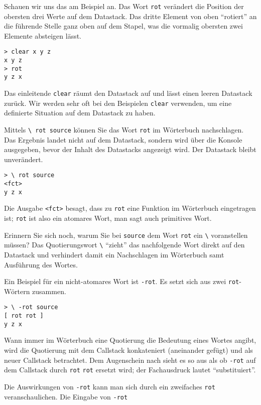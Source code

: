 Schauen wir uns das am Beispiel an. Das Wort \verb|rot| verändert die Position der obersten drei Werte auf dem Datastack. Das dritte Element von oben "`rotiert"' an die führende Stelle ganz oben auf dem Stapel, was die vormalig obersten zwei Elemente absteigen lässt.

\begin{verbatim}
> clear x y z
x y z
> rot
y z x
\end{verbatim}

Das einleitende \verb|clear| räumt den Datastack auf und lässt einen leeren Datastack zurück. Wir werden sehr oft bei den Beispielen \verb|clear| verwenden, um eine definierte Situation auf dem Datastack zu haben.

\label{rotsource}Mittels \verb|\ rot source| können Sie das Wort \verb|rot| im Wörterbuch nachschlagen. Das Ergebnis landet nicht auf dem Datastack, sondern wird über die Konsole ausgegeben, bevor der Inhalt des Datastacks angezeigt wird. Der Datastack bleibt unverändert.

\begin{verbatim}
> \ rot source
<fct>
y z x
\end{verbatim}

Die Ausgabe \verb|<fct>| besagt, dass zu \verb|rot| eine Funktion im Wörterbuch eingetragen ist; \verb|rot| ist also ein atomares Wort, man sagt auch primitives Wort.

Erinnern Sie sich noch, warum Sie bei \verb|source| dem Wort \verb|rot| ein \verb|\| voranstellen müssen? Das Quotierungswort \verb|\| "`zieht"' das nachfolgende Wort direkt auf den Datastack und verhindert damit ein Nachschlagen im Wörterbuch samt Ausführung des Wortes.

Ein Beispiel für ein nicht-atomares Wort ist \verb|-rot|. Es setzt sich aus zwei \verb|rot|-Wörtern zusammen.

\begin{verbatim}
> \ -rot source
[ rot rot ]
y z x
\end{verbatim}

Wann immer im Wörterbuch eine Quotierung die Bedeutung eines Wortes angibt, wird die Quotierung mit dem Callstack konkateniert (aneinander gefügt) und als neuer Callstack betrachtet. Dem Augenschein nach sieht es so aus als ob \verb|-rot| auf dem Callstack durch \verb|rot| \verb|rot| ersetzt wird; der Fachausdruck lautet "`substituiert"'. 

Die Auswirkungen von \verb|-rot| kann man sich durch ein zweifaches \verb|rot| veranschaulichen. Die Eingabe von \verb|-rot|

